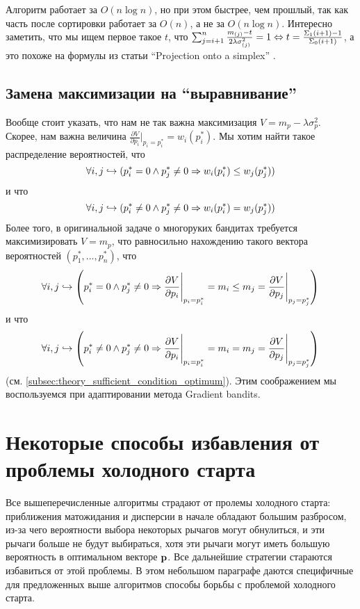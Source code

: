 Алгоритм работает за $O(n \log n)$, но при этом быстрее, чем прошлый, так как часть после сортировки работает за $O(n)$, а не за $O(n \log n)$. Интересно заметить, что мы ищем первое такое $t$, что $\sum_{j=i+1}^n \frac{m_{(j)} - t}{2\lambda \sigma_{(j)}^2} = 1 \Leftrightarrow t = \frac{\Sigma_1(i+1) - 1}{\Sigma_0(i+1)}$, а это похоже на формулы из статьи ``Projection onto a simplex'' \cite{simplex_projection}.

\subsection{Замена максимизации на ``выравнивание''}
\label{subsec:theory_alignment}

Вообще стоит указать, что нам не так важна максимизация $V = m_p - \lambda \sigma_p^2$. Скорее, нам важна величина $\frac{\partial V}{\partial p_i}\Bigg|_{p_i = p_i^*} = w_i(p_i^*)$. Мы хотим найти такое распределение вероятностей, что 
\[
    \forall i,j \hookrightarrow (p_i^* = 0 \land p_j^* \neq 0 \Rightarrow w_i(p_i^*) \leq w_j(p_j^*))
\]
и что 
\[
    \forall i,j \hookrightarrow (p_i^* \neq 0 \land p_j^* \neq 0 \Rightarrow w_i(p_i^*) = w_j(p_j^*))
\]
Более того, в оригинальной задаче о многоруких бандитах требуется максимизировать $V = m_p$, что равносильно нахождению такого вектора вероятностей $(p_1^*, ..., p_n^*)$, что 
\[
    \forall i,j \hookrightarrow \left(p_i^* = 0 \land p_j^* \neq 0 \Rightarrow \frac{\partial V}{\partial p_i}\Bigg|_{p_i = p_i^*} = m_i \leq m_j = \frac{\partial V}{\partial p_j}\Bigg|_{p_j = p_j^*} \right)
\]
и что 
\[
    \forall i,j \hookrightarrow \left(p_i^* \neq 0 \land p_j^* \neq 0 \Rightarrow \frac{\partial V}{\partial p_i}\Bigg|_{p_i = p_i^*} = m_i = m_j = \frac{\partial V}{\partial p_j}\Bigg|_{p_j = p_j^*} \right)
\]
(см. \ref{subsec:theory_sufficient_condition_optimum}). Этим соображением мы воспользуемся при адаптировании метода Gradient bandits.

\section{Некоторые способы избавления от проблемы холодного старта}

Все вышеперечисленные алгоритмы страдают от пролемы холодного старта: приближения матожидания и дисперсии в начале обладают большим разбросом, из-за чего вероятности выбора некоторых рычагов могут обнулиться, и эти рычаги больше не будут выбираться, хотя эти рычаги могут иметь большую вероятность в оптимальном векторе $\textbf{p}$. Все дальнейшие стратегии стараются избавиться от этой проблемы. В этом небольшом параграфе даются специфичные для предложенных выше алгоритмов способы борьбы с проблемой холодного старта.

